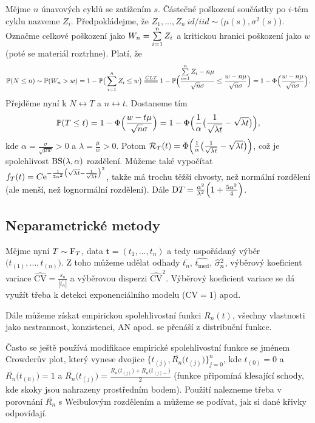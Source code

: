 \begin{define}
	 Mějme $n$ únavových cyklů se zatížením $s$. Částečné poškození součástky po $i$-tém cyklu nazveme $Z_i$. Předpokládejme, že $Z_1,...,Z_n~id/iid\sim \big(\mu(s),\sigma^2(s)\big)$. Označme celkové poškození jako $W_n=\sum\limits_{i=1}^{n} Z_i$ a kritickou hranici poškození jako $w$ (poté se materiál roztrhne). Platí, že 
	 $$ \PP(N\leq n)\sim \PP(W_n>w)=1-\PP\big(\sumin Z_i\leq w\big)\equal{CLT}1-\PP\Big(\frac{\sumin Z_i-n\mu}{\sqrt{n}\sigma}\leq \frac{w-n\mu}{\sqrt{n}\sigma}\Big)=1-\Phi\Big(\frac{w-n\mu}{\sqrt{n}\sigma}\Big). $$
	 Přejděme nyní k $N\leftrightarrow T$ a $n\leftrightarrow t$. Dostaneme tím 
	 $$ \mathbb{P}(T\leq t)=1-\Phi\Big(\frac{w-t\mu}{\sqrt{n}\sigma}\Big)=1-\Phi\Big(\frac{1}{\alpha}\big(\frac{1}{\sqrt{\lambda t}}-\sqrt{\lambda t}\big)\Big), $$ kde $\alpha=\frac{\sigma}{\sqrt{\mu w}}>0$ a $\lambda=\frac{\mu}{w}>0$. Potom $\mathcal{R}_T(t)=\Phi\Big(\frac{1}{\alpha}\big(\frac{1}{\sqrt{\lambda t}}-\sqrt{\lambda t}\big)\Big)$, což je spolehlivost $\mathrm{BS}(\lambda,\alpha)$ rozdělení. Můžeme také vypočítat $f_T(t)=C\mathrm{e}^{-\frac{1}{2\alpha^2}\big(\sqrt{\lambda t}-\frac{1}{\sqrt{\lambda t}}\big)^2}$, takže má trochu těžší chvosty, než normální rozdělení (ale menší, než lognormální rozdělení). Dále $\mathrm{D} T=\frac{\alpha^2}{\lambda^2}\Big(1+\frac{5\alpha^2}{4}\Big)$.
\end{define}


\subsection{Neparametrické metody}
Mějme nyní $T\sim\mathrm{F}_T$, data $\textbf{t}=(t_1,...,t_n)$ a tedy uspořádaný výběr $\big(t_{(1)},...,t_{(n)}\big)$. Z toho můžeme udělat odhady $\overline{t_n}$, $\widehat{t_\mathrm{med}}$, $\widehat{\sigma}_n^2$, výběrový koeficient variace $\widehat{\mathrm{CV}}=\frac{s_n}{|\overline{t_n}|}$ a výběrovou disperzi $\widehat{\mathrm{CV}}^2$. Výběrový koeficient variace se dá využít třeba k detekci exponenciálního modelu ($\mathrm{CV}=1$) apod.

Dále můžeme získat empirickou spolehlivostní funkci $R_n(t)$, všechny vlastnosti jako nestrannost, konzistenci, AN apod. se přenáší z distribuční funkce.

Často se ještě používá modifikace empirické spolehlivostní funkce se jménem Crowderův plot, který vynese dvojice $\big\{t_{(j)}, \overline{R_n}\big(t_{(j)}\big)\}_{j=0}^n$, kde $t_{(0)}=0$ a $\overline{R_n}\big(t_{(0)}\big)=1$ a $\overline{R_n}\big(t_{(j)}\big)=\frac{R_n\big(t_{(j)}\big)+R_n\big(t_{(j)-}\big)}{2}$ (funkce připomíná klesající schody, kde skoky jsou nahrazeny prostředním bodem). Použití nalezneme třeba v porovnání $\overline{R_n}$ s Weibulovým rozdělením a můžeme se podívat, jak si dané křivky odpovídají.

